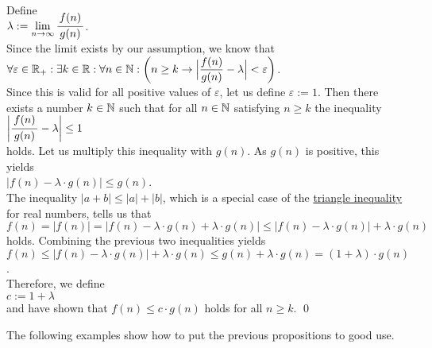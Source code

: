 \proof
Define \\[0.2cm]
\hspace*{1.3cm}
$\lambda := \lim\limits_{n \rightarrow \infty} \bruch{f(n)}{g(n)}$.  
\\[0.2cm]
Since the limit exists by our assumption, we know that
\\[0.2cm]
\hspace*{1.3cm}
$\displaystyle\forall \varepsilon \in \mathbb{R}_+:\exists k \in \mathbb{R}: \forall n \in \mathbb{N}: 
 \biggl(n \geq k \rightarrow \Bigl| \frac{f(n)}{g(n)} - \lambda \Bigr| < \varepsilon \biggr)
$.
\\[0.2cm]
Since this is valid for all positive values of $\varepsilon$, let us define $\varepsilon := 1$. 
Then there exists a number $k \in {\mathbb N}$ such that
for all $n\in {\mathbb N}$ satisfying $n \geq k$ the inequality 
\\[0.2cm]
\hspace*{1.3cm}
$\left| \bruch{f(n)}{g(n)} - \lambda \right| \leq 1$ 
\\[0.2cm]
holds.  Let us multiply this inequality with $g(n)$.  As $g(n)$ is positive, this yields
\\[0.2cm]
\hspace*{1.3cm}
$|f(n) - \lambda \cdot g(n)| \leq g(n)$. 
\\[0.2cm]
The inequality $|a + b| \leq |a| + |b|$, which is a special case of the
\href{https://en.wikipedia.org/wiki/Triangle_inequality}{triangle inequality} for
real numbers, tells us that  
\\[0.2cm]
\hspace*{1.3cm}
$f(n) =    \bigl|f(n)\bigr|
      =    \bigl|f(n) - \lambda \cdot g(n) + \lambda \cdot g(n)\bigr|
      \leq \bigl|f(n) - \lambda \cdot g(n)\bigr| + \lambda \cdot g(n)$ 
\\[0.2cm]
holds.  Combining the previous two inequalities yields
\\[0.2cm]
\hspace*{1.3cm}
$f(n) \leq \bigl|f(n) - \lambda \cdot g(n)\bigr| + \lambda \cdot g(n)
      \leq g(n) + \lambda \cdot g(n)
       =   (1 + \lambda) \cdot g(n)
$.
\\[0.2cm]
Therefore, we define
\\[0.2cm]
\hspace*{1.3cm}
 $c := 1 +  \lambda$
\\[0.2cm] 
and have shown that $f(n) \leq c \cdot g(n)$ holds for all $n \geq k$. \qed
\vspace*{0.3cm}

\noindent
The following examples show how to put the previous propositions to good use.

